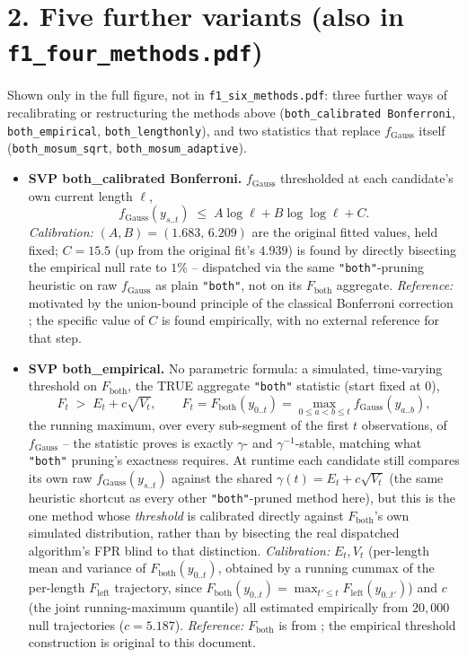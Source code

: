 \documentclass[11pt]{article}
\begin{document}
\section*{2. Five further variants (also in \texttt{f1\_four\_methods.pdf})}

Shown only in the full figure, not in \texttt{f1\_six\_methods.pdf}: three
further ways of recalibrating or restructuring the methods above
(\texttt{both\_calibrated Bonferroni}, \texttt{both\_empirical},
\texttt{both\_lengthonly}), and two statistics that replace
$f_{\mathrm{Gauss}}$ itself (\texttt{both\_mosum\_sqrt},
\texttt{both\_mosum\_adaptive}).

\begin{itemize}

\item \textbf{SVP both\_calibrated Bonferroni.} $f_{\mathrm{Gauss}}$
thresholded at each candidate's own current length $\ell$,
\[
f_{\mathrm{Gauss}}(y_{s..t}) \;\le\; A\log\ell + B\log\log\ell + C.
\]
\emph{Calibration:} $(A,B)=(1.683,\,6.209)$ are the original fitted
values, held fixed; $C=15.5$ (up from the original fit's $4.939$) is found
by directly bisecting the empirical null rate to $1\%$ -- dispatched via
the same \texttt{"both"}-pruning heuristic on raw $f_{\mathrm{Gauss}}$ as
plain \texttt{"both"}, not on its $F_{\mathrm{both}}$ aggregate.
\emph{Reference:} motivated by the union-bound principle of the classical
Bonferroni correction \cite{bonferroni1936}; the specific value of $C$ is
found empirically, with no external reference for that step.

\item \textbf{SVP both\_empirical.} No parametric formula: a simulated,
time-varying threshold on $F_{\mathrm{both}}$, the TRUE aggregate
\texttt{"both"} statistic (start fixed at $0$),
\[
F_t \;>\; E_t + c\sqrt{V_t},
\qquad F_t = F_{\mathrm{both}}(y_{0..t}) = \max_{0\le a<b\le t} f_{\mathrm{Gauss}}(y_{a..b}),
\]
the running maximum, over every sub-segment of the first $t$ observations,
of $f_{\mathrm{Gauss}}$ -- the statistic \cite{runge2026svp} proves is
exactly $\gamma$- and $\gamma^{-1}$-stable, matching what \texttt{"both"}
pruning's exactness requires. At runtime each candidate still
compares its own raw $f_{\mathrm{Gauss}}(y_{s..t})$ against the shared
$\gamma(t)=E_t+c\sqrt{V_t}$ (the same heuristic shortcut as every other
\texttt{"both"}-pruned method here), but this is the one method whose
\emph{threshold} is calibrated directly against $F_{\mathrm{both}}$'s own
simulated distribution, rather than by bisecting the real dispatched
algorithm's FPR blind to that distinction. \emph{Calibration:} $E_t,V_t$
(per-length mean and variance of $F_{\mathrm{both}}(y_{0..t})$, obtained
by a running cummax of the per-length $F_{\mathrm{left}}$ trajectory,
since $F_{\mathrm{both}}(y_{0..t})=\max_{t'\le t}F_{\mathrm{left}}(y_{0..t'})$)
and $c$ (the joint running-maximum quantile) all estimated empirically
from $20{,}000$ null trajectories ($c=5.187$). \emph{Reference:}
$F_{\mathrm{both}}$ is from \cite{runge2026svp}; the empirical threshold
construction is original to this document.


\end{itemize}
\end{document}
